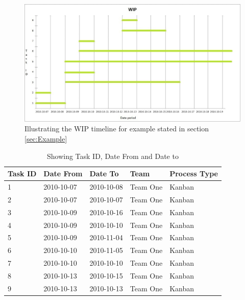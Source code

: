 \documentclass[UKenglish]{ifimaster}  %
\begin{document}
\begin{figure}[ht!]
 \begin{adjustwidth}{-0.5cm}{}
\centering
\hspace*{-1in}
\includegraphics[width=21cm,trim=4 8 8 4,clip]{Picture/wip_example.jpg}
\caption{Illustrating the WIP timeline for example stated in section \ref{sec:Example}}
\label{wip_timeline}
\end{adjustwidth}
\end{figure}

\newpage
\begin{table}[!ht]
\begin{center}
    \begin{tabular}{| l | l | p{2cm} | l | l |}
    \hline
   Task ID &   Date From  & Date To & Team & Process Type\\ \hline
     1 & 2010-10-07 & 2010-10-08 & Team One & Kanban  \\ \hline
     2 & 2010-10-07 & 2010-10-07 & Team One & Kanban   \\ \hline
     3 & 2010-10-09 & 2010-10-16 & Team One & Kanban   \\ \hline
     4 & 2010-10-09 & 2010-10-10 & Team One & Kanban   \\ \hline
     5 & 2010-10-09 & 2010-11-04 & Team One & Kanban   \\ \hline
     6 & 2010-10-10 & 2010-11-05 & Team One & Kanban  \\ \hline
     7 & 2010-10-10 & 2010-10-10 & Team One & Kanban   \\ \hline
     8 & 2010-10-13 & 2010-10-15 & Team One & Kanban  \\ \hline
     9 & 2010-10-13 & 2010-10-13  & Team One  & Kanban   \\ \hline
    \end{tabular}
\caption{Showing Task ID, Date From and Date to}
\label{wt:2} %
\end{center}
\end{table}
\end{document}
